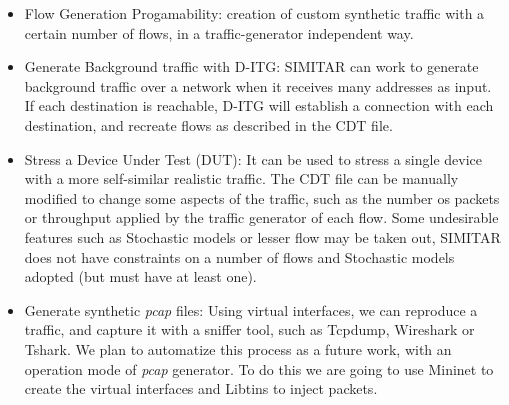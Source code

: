 \begin{itemize}

\item Flow Generation Progamability: creation of custom synthetic traffic with a certain number of flows, in a traffic-generator independent way.

\item Generate Background traffic with D-ITG: SIMITAR can work to generate background traffic over a network when it receives many addresses as input. If each destination is reachable, D-ITG will establish a connection with each destination, and recreate flows as described in the CDT file. 

\item Stress a Device Under Test (DUT): It can be used to stress a single device with a more self-similar realistic traffic. The CDT file can be manually modified to change some aspects of the traffic, such as the number os packets or throughput applied by the traffic generator of each flow. Some undesirable features such as Stochastic models or lesser flow may be taken out, SIMITAR does not have constraints on a number of flows and Stochastic models adopted (but must have at least one).

\item Generate synthetic \textit{pcap} files: Using virtual interfaces, we can reproduce a traffic, and capture it with a sniffer tool, such as Tcpdump, Wireshark or Tshark. We plan to automatize this process as a future work, with an operation mode of \textit{pcap} generator. To do this we are going to use Mininet to create the virtual interfaces and Libtins to inject packets.

\end{itemize}




